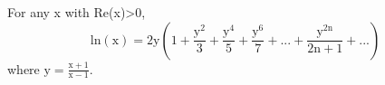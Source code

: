 For any x with Re(x)>0,
\[ \mathrm{ln(x)}
= 2 \mathrm{y}
\left (
1
+ \frac{\mathrm{y}^2}{3}
+ \frac{\mathrm{y}^4}{5}
+ \frac{\mathrm{y}^6}{7}
+ ...
+ \frac{\mathrm{y}^{2 \mathrm{n}}}{2 \mathrm{n} + 1}
+ ...
\right )
\]
where $ \mathrm{y} = \frac{\mathrm{x}+1}{\mathrm{x}-1} . $